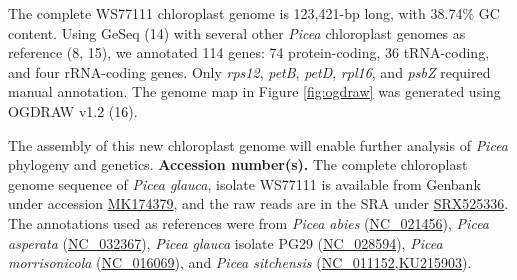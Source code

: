 \documentclass[titlepage,11pt, oneside]{article}   	%
\begin{document}
\newline
\par
The complete WS77111 chloroplast genome is 123,421-bp long, with 38.74\% GC content. Using GeSeq (14) with several other \textit{Picea} chloroplast genomes as reference (8, 15), we annotated 114 genes: 74 protein-coding, 36 tRNA-coding, and four rRNA-coding genes. Only \textit{rps12}, \textit{petB}, \textit{petD}, \textit{rpl16}, and \textit{psbZ} required manual annotation. The genome map in Figure \ref{fig:ogdraw} was generated using OGDRAW v1.2 (16). 
\newline
\par
The assembly of this new chloroplast genome will enable further analysis of \textit{Picea} phylogeny and genetics.
\newline
\newline
\textbf{Accession number(s).} The complete chloroplast genome sequence of \textit{Picea glauca}, isolate WS77111 is available from Genbank under accession \href{https://www.ncbi.nlm.nih.gov/nuccore/MK174379}{MK174379}, and the raw reads are in the SRA under \href{https://www.ncbi.nlm.nih.gov/sra/SRX525336}{SRX525336}. The annotations used as references were from \textit{Picea abies} (\href{https://www.ncbi.nlm.nih.gov/nuccore/NC_021456}{NC\_021456}), \textit{Picea asperata} (\href{https://www.ncbi.nlm.nih.gov/nuccore/NC_032367}{NC\_032367}), \textit{Picea glauca} isolate PG29 (\href{https://www.ncbi.nlm.nih.gov/nuccore/NC_028594}{NC\_028594}), \textit{Picea morrisonicola} (\href{https://www.ncbi.nlm.nih.gov/nuccore/NC_016069}{NC\_016069}), and \textit{Picea sitchensis }(\href{https://www.ncbi.nlm.nih.gov/nuccore/NC_011152}{NC\_011152},\href{https://www.ncbi.nlm.nih.gov/nuccore/KU215903.2}{KU215903}).
\end{document}
